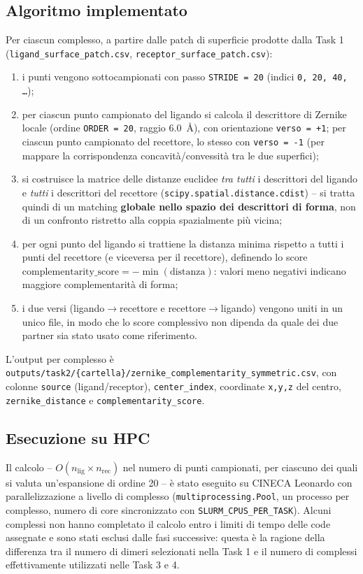 \documentclass[11pt,a4paper]{article}
\begin{document}
\subsection{Algoritmo implementato}
Per ciascun complesso, a partire dalle patch di superficie prodotte dalla Task 1 (\texttt{ligand\_surface\_patch.csv}, \texttt{receptor\_surface\_patch.csv}):
\begin{enumerate}
    \item i punti vengono sottocampionati con passo \texttt{STRIDE = 20} (indici \texttt{0, 20, 40, \dots});
    \item per ciascun punto campionato del ligando si calcola il descrittore di Zernike locale (ordine \texttt{ORDER = 20}, raggio 6.0~\r{A}), con orientazione \texttt{verso = +1}; per ciascun punto campionato del recettore, lo stesso con \texttt{verso = -1} (per mappare la corrispondenza concavità/convessità tra le due superfici);
    \item si costruisce la matrice delle distanze euclidee \emph{tra tutti} i descrittori del ligando e \emph{tutti} i descrittori del recettore (\texttt{scipy.spatial.distance.cdist}) -- si tratta quindi di un matching \textbf{globale nello spazio dei descrittori di forma}, non di un confronto ristretto alla coppia spazialmente più vicina;
    \item per ogni punto del ligando si trattiene la distanza minima rispetto a tutti i punti del recettore (e viceversa per il recettore), definendo lo score $\text{complementarity\_score} = -\min(\text{distanza})$: valori meno negativi indicano maggiore complementarità di forma;
    \item i due versi (ligando$\to$recettore e recettore$\to$ligando) vengono uniti in un unico file, in modo che lo score complessivo non dipenda da quale dei due partner sia stato usato come riferimento.
\end{enumerate}

L'output per complesso è \texttt{outputs/task2/\{cartella\}/zernike\_complementarity\_symmetric.csv}, con colonne \texttt{source} (ligand/receptor), \texttt{center\_index}, coordinate \texttt{x,y,z} del centro, \texttt{zernike\_distance} e \texttt{complementarity\_score}.

\subsection{Esecuzione su HPC}
Il calcolo -- $O(n_{\text{lig}}\times n_{\text{rec}})$ nel numero di punti campionati, per ciascuno dei quali si valuta un'espansione di ordine 20 -- è stato eseguito su CINECA Leonardo con parallelizzazione a livello di complesso (\texttt{multiprocessing.Pool}, un processo per complesso, numero di core sincronizzato con \texttt{SLURM\_CPUS\_PER\_TASK}). Alcuni complessi non hanno completato il calcolo entro i limiti di tempo delle code assegnate e sono stati esclusi dalle fasi successive: questa è la ragione della differenza tra il numero di dimeri selezionati nella Task 1 e il numero di complessi effettivamente utilizzati nelle Task 3 e 4.
\end{document}
